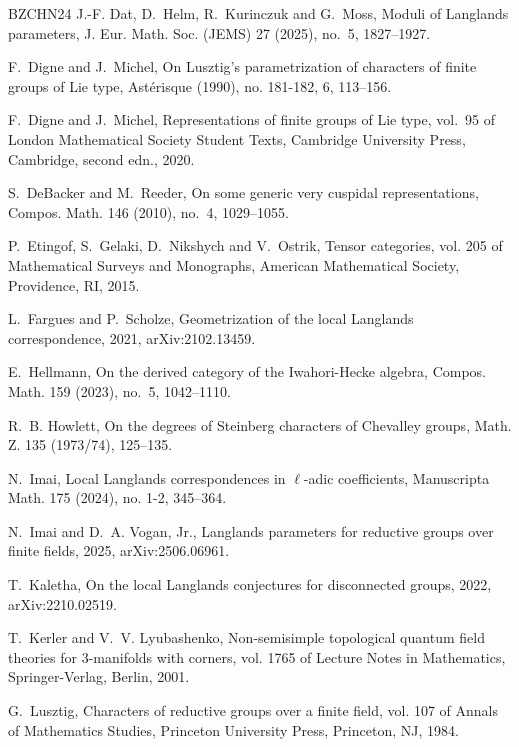\documentclass[12pt,a4paper]{article}
\begin{document}
\begin{thebibliography}{BZCHN24}
	J.-F. Dat, D.~Helm, R.~Kurinczuk and G.~Moss, Moduli of {L}anglands parameters,
	J. Eur. Math. Soc. (JEMS) 27 (2025), no.~5, 1827--1927.
	
	F.~Digne and J.~Michel, On {L}usztig's parametrization of characters of finite
	groups of {L}ie type, Ast\'{e}risque  (1990), no. 181-182, 6, 113--156.
	
	F.~Digne and J.~Michel, Representations of finite groups of {L}ie type, vol.~95
	of London Mathematical Society Student Texts, Cambridge University Press,
	Cambridge, second edn., 2020.
	
	S.~DeBacker and M.~Reeder, On some generic very cuspidal representations,
	Compos. Math. 146 (2010), no.~4, 1029--1055.
	
	P.~Etingof, S.~Gelaki, D.~Nikshych and V.~Ostrik, Tensor categories, vol. 205
	of Mathematical Surveys and Monographs, American Mathematical Society,
	Providence, RI, 2015.
	
	L.~Fargues and P.~Scholze, Geometrization of the local {L}anglands
	correspondence, 2021, arXiv:2102.13459.
	
	E.~Hellmann, On the derived category of the {I}wahori-{H}ecke algebra, Compos.
	Math. 159 (2023), no.~5, 1042--1110.
	
	R.~B. Howlett, On the degrees of {S}teinberg characters of {C}hevalley groups,
	Math. Z. 135 (1973/74), 125--135.
	
	N.~Imai, Local {L}anglands correspondences in $\ell$-adic coefficients,
	Manuscripta Math. 175 (2024), no. 1-2, 345--364.
	
	N.~Imai and D.~A. Vogan, Jr., Langlands parameters for reductive groups over
	finite fields, 2025, arXiv:2506.06961.
	
	T.~Kaletha, On the local Langlands conjectures for disconnected groups, 2022,
	arXiv:2210.02519.
	
	T.~Kerler and V.~V. Lyubashenko, Non-semisimple topological quantum field
	theories for 3-manifolds with corners, vol. 1765 of Lecture Notes in
	Mathematics, Springer-Verlag, Berlin, 2001.
	
	G.~Lusztig, Characters of reductive groups over a finite field, vol. 107 of
	Annals of Mathematics Studies, Princeton University Press, Princeton, NJ,
	1984.
	

\end{thebibliography}
\end{document}
